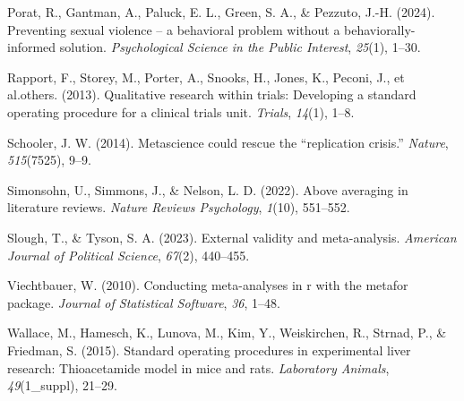 \documentclass[
  man]{apa6}
\newlength{\cslhangindent}
\newenvironment{CSLReferences}[2] %
 {\begin{list}{}{%
  \setlength{\itemindent}{0pt}
  \setlength{\leftmargin}{0pt}
  \setlength{\parsep}{0pt}
  \ifodd #1
   \setlength{\leftmargin}{\cslhangindent}
   \setlength{\itemindent}{-1\cslhangindent}
  \fi
  \setlength{\itemsep}{#2\baselineskip}}}
 {\end{list}}
\begin{document}
\begin{CSLReferences}{1}{0}
Porat, R., Gantman, A., Paluck, E. L., Green, S. A., \& Pezzuto, J.-H. (2024). Preventing sexual violence -- a behavioral problem without a behaviorally-informed solution. \emph{Psychological Science in the Public Interest}, \emph{25}(1), 1--30.

Rapport, F., Storey, M., Porter, A., Snooks, H., Jones, K., Peconi, J., et al.others. (2013). Qualitative research within trials: Developing a standard operating procedure for a clinical trials unit. \emph{Trials}, \emph{14}(1), 1--8.

Schooler, J. W. (2014). Metascience could rescue the {``replication crisis.''} \emph{Nature}, \emph{515}(7525), 9--9.

Simonsohn, U., Simmons, J., \& Nelson, L. D. (2022). Above averaging in literature reviews. \emph{Nature Reviews Psychology}, \emph{1}(10), 551--552.

Slough, T., \& Tyson, S. A. (2023). External validity and meta-analysis. \emph{American Journal of Political Science}, \emph{67}(2), 440--455.

Viechtbauer, W. (2010). Conducting meta-analyses in r with the metafor package. \emph{Journal of Statistical Software}, \emph{36}, 1--48.

Wallace, M., Hamesch, K., Lunova, M., Kim, Y., Weiskirchen, R., Strnad, P., \& Friedman, S. (2015). Standard operating procedures in experimental liver research: Thioacetamide model in mice and rats. \emph{Laboratory Animals}, \emph{49}(1\_suppl), 21--29.

\end{CSLReferences}
\end{document}
